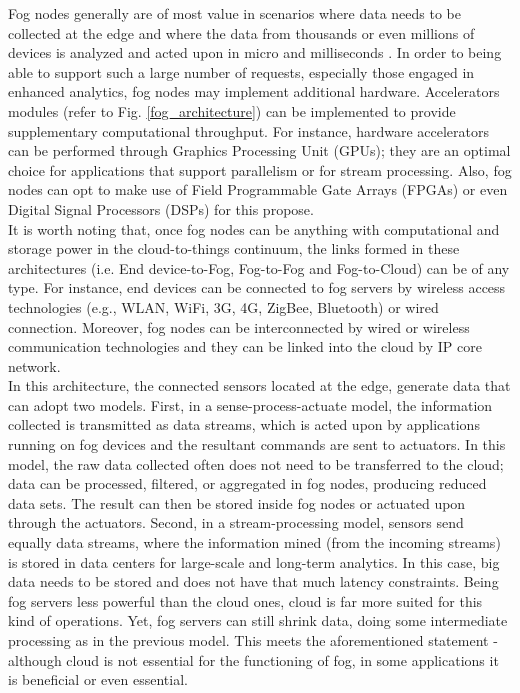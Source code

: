 \noindent\tab Fog nodes generally are of most value in scenarios where data needs to be collected at the edge and where the data from thousands or even millions of devices is analyzed and acted upon in micro and milliseconds \cite{openfog2017openfog}. In order to being able to support such a large number of requests, especially those engaged in enhanced analytics, fog nodes may implement additional hardware. Accelerators modules (refer to Fig. \ref{fog_architecture}) can be implemented to provide supplementary computational throughput. For instance, hardware accelerators can be performed through Graphics Processing Unit (GPUs); they are an optimal choice for applications that support parallelism or for stream processing. Also, fog nodes can opt to make use of Field Programmable Gate Arrays (FPGAs) or even Digital Signal Processors (DSPs) for this propose.\\
\noindent\tab It is worth noting that, once fog nodes can be anything with computational and storage power in the cloud-to-things continuum, the links formed in these architectures (i.e. End device-to-Fog, Fog-to-Fog and Fog-to-Cloud) can be of any type. For instance, end devices can be connected to fog servers by wireless access technologies (e.g., WLAN, WiFi, 3G, 4G, ZigBee, Bluetooth) or wired connection. Moreover, fog nodes can be interconnected by wired or wireless communication technologies and they can be linked into the cloud by IP core network.\\
\noindent\tab In this architecture, the connected sensors located at the edge, generate data that can adopt two models. First, in a sense-process-actuate model, the information collected is transmitted as data streams, which is acted upon by applications running on fog devices and the resultant commands are sent to actuators. In this model, the raw data collected often does not need to be transferred to the cloud; data can be processed, filtered, or aggregated in fog nodes, producing reduced data sets. The result can then be stored inside fog nodes or actuated upon through the actuators. Second, in a stream-processing model, sensors send equally data streams, where the information mined (from the incoming streams) is stored in data centers for large-scale and long-term analytics. In this case, big data needs to be stored and does not have that much latency constraints. Being fog servers less powerful than the cloud ones, cloud is far more suited for this kind of operations. Yet, fog servers can still shrink data, doing some intermediate processing as in the previous model. This meets the aforementioned statement - although cloud is not essential for the functioning of fog, in some applications it is beneficial or even essential.\\
